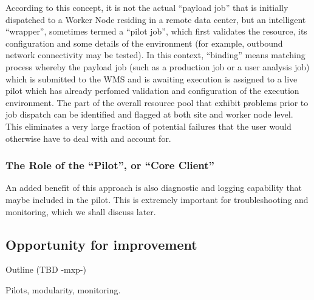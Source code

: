 According to this concept, it is not the actual ``payload job'' that is initially dispatched to a  Worker Node residing in a
remote data center, but an intelligent ``wrapper'', sometimes termed a ``pilot job'', which first validates the resource, its configuration and
some details of the environment (for example, outbound network connectivity may be tested). In this context, ``binding'' means matching process
whereby the payload job (such as a production job or a user analysis job) which is submitted to the WMS and is awaiting execution is assigned to a
live pilot which has already perfomed validation and configuration of the execution environment. The part of the overall resource pool that exhibit
problems prior to job dispatch can be identified and flagged at both site and worker node level. This eliminates a very large fraction of potential failures
that the user would otherwise have to deal with and account for.

\subsubsection{The Role of the ``Pilot'', or ``Core Client''}
An added benefit of this approach is also diagnostic and logging capability that maybe included
in the pilot. This is extremely important for troubleshooting and monitoring, which we shall discuss later.
\subsection{Opportunity for improvement}

Outline (TBD -mxp-)

Pilots, modularity, monitoring.



